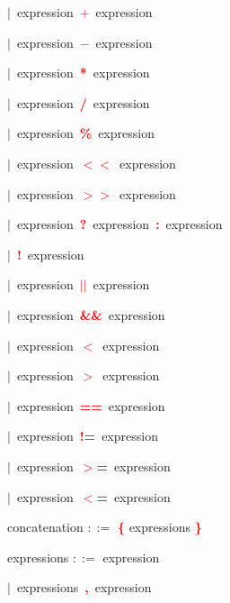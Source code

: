 \mbox{$|$ expression \textbf{\textcolor{red}{$+$}} expression}

\mbox{$|$ expression \textbf{\textcolor{red}{$-$}} expression}

\mbox{$|$ expression \textbf{\textcolor{red}{*}} expression}

\mbox{$|$ expression \textbf{\textcolor{red}{/}} expression}

\mbox{$|$ expression \textbf{\textcolor{red}{\textbf{\textcolor{red}{\%}}}} expression}

\mbox{$|$ expression \textbf{\textcolor{red}{$<$$<$}} expression}

\mbox{$|$ expression \textbf{\textcolor{red}{$>$$>$}} expression}

\mbox{$|$ expression \textbf{\textcolor{red}{?}} expression \textbf{\textcolor{red}{:}} expression}

\mbox{$|$ \textbf{\textcolor{red}{!}} expression}

\mbox{$|$ expression \textbf{\textcolor{red}{$|$$|$}} expression}

\mbox{$|$ expression \textbf{\textcolor{red}{\textbf{\textcolor{red}{\&}}\textbf{\textcolor{red}{\&}}}} expression}

\mbox{$|$ expression \textbf{\textcolor{red}{$<$}} expression}

\mbox{$|$ expression \textbf{\textcolor{red}{$>$}} expression}

\mbox{$|$ expression \textbf{\textcolor{red}{==}} expression}

\mbox{$|$ expression \textbf{\textcolor{red}{!=}} expression}

\mbox{$|$ expression \textbf{\textcolor{red}{$>$=}} expression}

\mbox{$|$ expression \textbf{\textcolor{red}{$<$=}} expression}

\vspace{1em}
\noindent
\settowidth{\parindent}{\hspace{4ex}}
concatenation $::=$\hspace{1ex} \textbf{\textcolor{red}{\textbf{\textcolor{red}{\{}}}} expressions \textbf{\textcolor{red}{\textbf{\textcolor{red}{\}}}}}

\vspace{1em}
\noindent
\settowidth{\parindent}{\hspace{4ex}}
expressions $::=$\hspace{1ex} expression

\mbox{$|$ expressions \textbf{\textcolor{red}{,}} expression}

